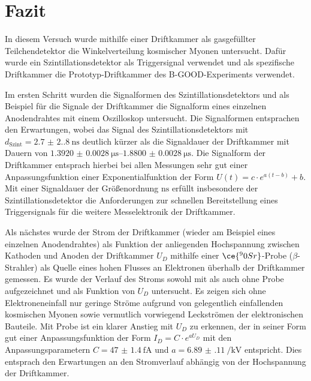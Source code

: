 \chapter{Fazit}

In diesem Versuch wurde mithilfe einer Driftkammer als gasgefüllter Teilchendetektor die Winkelverteilung kosmischer Myonen untersucht.
Dafür wurde ein Szintillationsdetektor als Triggersignal verwendet und als spezifische Driftkammer die Prototyp-Driftkammer des B-GOOD-Experiments verwendet.

Im ersten Schritt wurden die Signalformen des Szintillationsdetektors und als Beispiel für die Signale der Driftkammer die Signalform eines einzelnen Anodendrahtes mit einem Oszilloskop untersucht. Die Signalformen entsprachen den Erwartungen, wobei das Signal des Szintillationsdetektors mit $d_\text{Szint}=\SI{2.7(2.8)}{\nano\s}$ deutlich kürzer als die Signaldauer der Driftkammer mit Dauern von $\SIrange{1.3920(28)}{1.8800(28)}{\micro\s}$. Die Signalform der Driftkammer entsprach hierbei bei allen Messungen sehr gut einer Anpassungsfunktion einer Exponentialfunktion der Form $U(t)=c\cdot e^{a(t-b)}+b$. Mit einer Signaldauer der Größenordnung $\unit{\nano\s}$ erfüllt insbesondere der Szintillationsdetektor die Anforderungen zur schnellen Bereitstellung eines Triggersignals für die weitere Messelektronik der Driftkammer.

Als nächstes wurde der Strom der Driftkammer (wieder am Beispiel eines einzelnen Anodendrahtes) als Funktion der anliegenden Hochspannung zwischen Kathoden und Anoden der Driftkammer $U_D$ mithilfe einer $\ce{^90Sr}$-Probe ($\beta$-Strahler) als Quelle eines hohen Flusses an Elektronen überhalb der Driftkammer gemessen. Es wurde der Verlauf des Stroms sowohl mit als auch ohne Probe aufgezeichnet und als Funktion von $U_D$ untersucht. Es zeigen sich ohne Elektroneneinfall nur geringe Ströme aufgrund von gelegentlich einfallenden kosmischen Myonen sowie vermutlich vorwiegend Leckströmen der elektronischen Bauteile. Mit Probe ist ein klarer Anstieg mit $U_D$ zu erkennen, der in seiner Form gut einer Anpassungsfunktion der Form $I_D=C\cdot e^{a U_D}$ mit den Anpassungsparametern $C=\SI{47(1.4)}{\femto\A}$ und $a=\SI{6.89(11)}{\per\kilo\V}$ entspricht. Dies entsprach den Erwartungen an den Stromverlauf abhängig von der Hochspannung der Driftkammer.

